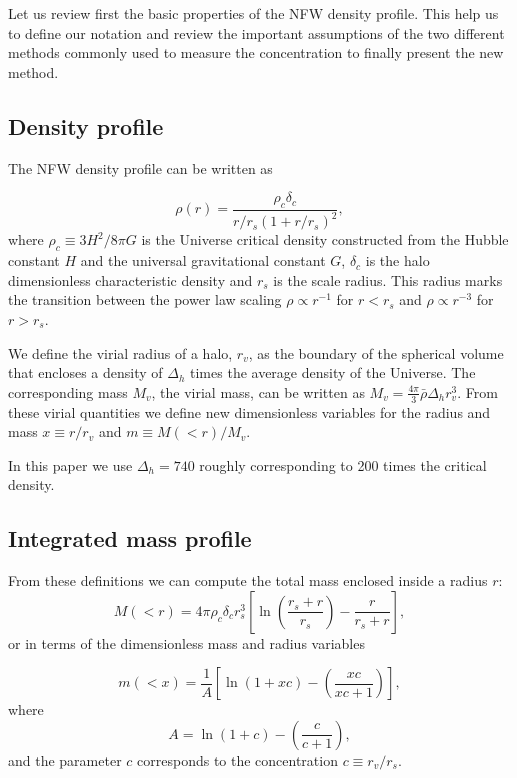 \documentclass[a4,useAMS,usenatbib,usegraphicx]{mn2e}
\begin{document}
Let us review first the basic properties of the NFW density
profile. 
This help us to define our notation and review the important
assumptions of the two different methods commonly used to measure the
concentration to finally present the new method.

\subsection{Density profile}

The NFW density profile can be written as

\begin{equation}
\rho(r) = \frac{\rho_c\delta_c}{r/r_s(1+r/r_s)^2},
\label{eq:definition}
\end{equation}
%
where $\rho_c\equiv 3H^2/8\pi G$ is the Universe critical density
constructed from the Hubble constant $H$ and the universal
gravitational constant $G$,
$\delta_c$ is the halo dimensionless characteristic density and $r_s$
is the scale radius. This radius marks the transition
between the power law scaling $\rho\propto r^{-1}$ for
$r<r_s$ and $\rho\propto r^{-3}$ for  $r>r_s$.

We define the virial radius of a halo, $r_v$, as the boundary of the
spherical volume that encloses a density of $\Delta_h$ times
the average density of the Universe. 
The corresponding mass $M_{v}$, the virial mass, can be written as
$M_{v} = \frac{4\pi}{3}\bar{\rho}\Delta_h r_v^3$.
From these virial quantities we define new dimensionless variables for
the radius and mass $x\equiv r/r_v$ and $m\equiv
M(<r)/M_v$.

In this paper we use $\Delta_h=740$ roughly corresponding to 200 times
the critical density.  


\subsection{Integrated mass profile}
From these definitions we can compute the total mass enclosed inside a
radius $r$:
\begin{equation}
M(<r) = 4\pi\rho_c\delta_c  r_s^3\left[\ln \left
  (\frac{r_s+r}{r_s}\right) - \frac{r}{r_s+r}\right],
\end{equation}
%
or in terms of the dimensionless mass and radius variables

\begin{equation}
m(<x) =
\frac{1}{A}\left[\ln\left(1+xc\right)-\left(\frac{xc}{xc+1}\right)\right],
\label{eq:profile}
\end{equation}
%
where
%
\begin{equation}
A=\ln\left(1+c\right)-\left(\frac{c}{c+1}\right),
\end{equation}
%
and the parameter $c$ corresponds to the concentration $c\equiv r_v/r_s$.
\end{document}
